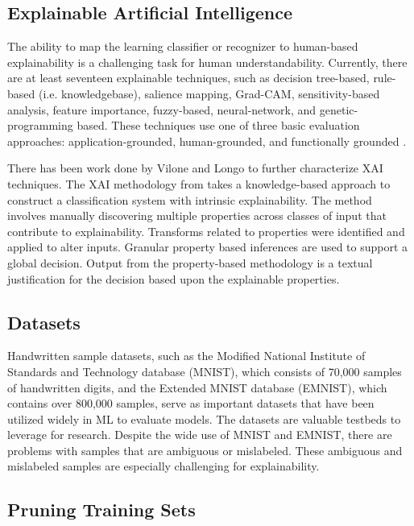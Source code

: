 \documentclass[conference]{IEEEtran}
\begin{document}
\subsection{Explainable Artificial Intelligence}

The ability to map the learning classifier or recognizer to human-based
explainability is a challenging task for human understandability.  Currently,
there are at least seventeen explainable techniques, such as decision tree-based,
rule-based (i.e. knowledgebase), salience mapping, Grad-CAM, sensitivity-based analysis,
feature importance, fuzzy-based, neural-network, and genetic-programming based.
These techniques use one of three basic evaluation approaches:
application-grounded, human-grounded, and functionally grounded
\cite{Arrieta2020ExplainableAI,Survey18,Fuzzy19,Hagras18,GP18,selvaraju2017grad}.

There has been work done by Vilone and Longo \cite{vilone2020explainable} to
further characterize XAI techniques.  The XAI methodology from \cite{whitten21}
takes a knowledge-based approach to construct a classification system with
intrinsic explainability.  The method involves manually discovering multiple
properties across classes of input that contribute to explainability.
Transforms related to properties were identified and applied to alter inputs.
Granular property based inferences are used to support a global decision.
Output from the property-based methodology is a textual justification for the
decision based upon the explainable properties.

\subsection{Datasets}

Handwritten sample datasets, such as the Modified National Institute of
Standards and Technology database (MNIST)\cite{deng2012mnist}, which consists of
70,000 samples of handwritten digits, and the Extended MNIST database\cite{cohen2017emnist}
(EMNIST), which contains over 800,000 samples, serve as
important datasets that have been utilized widely in ML to evaluate models. The
datasets are valuable testbeds to leverage for research. Despite the wide use of
MNIST and EMNIST, there are problems with samples that are ambiguous or
mislabeled.  These ambiguous and mislabeled samples are especially challenging
for explainability.

\subsection{Pruning Training Sets}
\end{document}
